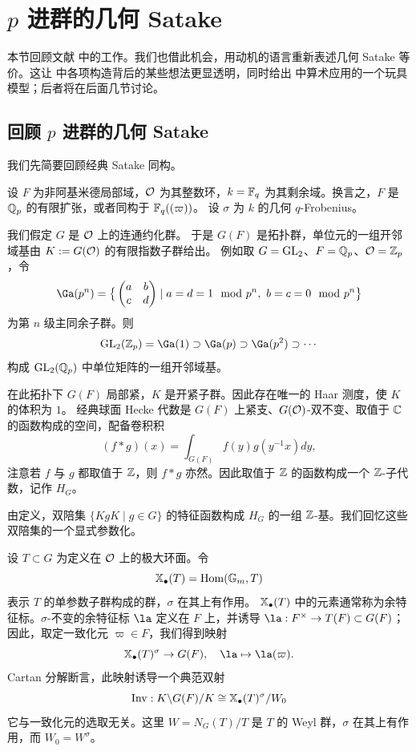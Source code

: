 \section{$p$ 进群的几何 Satake}
\label{S: GSat}

本节回顾文献 \cite{Zh1} 中的工作。我们也借此机会，用动机的语言重新表述几何 Satake 等价。这让 \cite{Zh1} 中各项构造背后的某些想法更显透明，同时给出 \cite{XZ} 中算术应用的一个玩具模型；后者将在后面几节讨论。

\subsection{回顾 $p$ 进群的几何 Satake}
\label{S: affGrass}

我们先简要回顾经典 Satake 同构。

设 $F$ 为非阿基米德局部域，${\mathcal O}$ 为其整数环，$k={\mathbb F}_q$ 为其剩余域。换言之，$F$ 是 ${\mathbb Q}_p$ 的有限扩张，或者同构于 ${\mathbb F}_q((\varpi))$。
设 $\sigma$ 为 $k$ 的几何 $q$-Frobenius。

我们假定 $G$ 是 ${\mathcal O}$ 上的连通约化群。
于是 $G(F)$ 是拓扑群，单位元的一组开邻域基由 $K:=G({\mathcal O})$ 的有限指数子群给出。
例如取 $G={\operatorname{GL}}_2$、$F={\mathbb Q}_p$、${\mathcal O}={\mathbb Z}_p$，令
$$\Ga(p^n)=\big\{\begin{pmatrix}a& b\\ c& d\end{pmatrix}\mid a=d=1 \mod p^n,\  b=c=0 \mod p^n\big\}$$
为第 $n$ 级主同余子群。则
$$\GL_2(\bZ_p)=\Ga(1)\supset\Ga(p)\supset\Ga(p^2)\supset\cdots$$ 构成 ${\operatorname{GL}}_2({\mathbb Q}_p)$ 中单位矩阵的一组开邻域基。

在此拓扑下 $G(F)$ 局部紧，$K$ 是开紧子群。因此存在唯一的 Haar 测度，使 $K$ 的体积为 $1$。
经典球面 Hecke 代数是 $G(F)$ 上紧支、$G({\mathcal O})$-双不变、取值于 ${\mathbb C}$ 的函数构成的空间，配备卷积积
\begin{equation}
\label{E:conv prod alge}
(f*g)(x)=\int_{G(F)}f(y)g(y^{-1}x)dy,
\end{equation}
注意若 $f$ 与 $g$ 都取值于 ${\mathbb Z}$，则 $f*g$ 亦然。因此取值于 ${\mathbb Z}$ 的函数构成一个 ${\mathbb Z}$-子代数，记作 $H_G$。

由定义，双陪集 $\{KgK\mid g\in G\}$ 的特征函数构成 $H_G$ 的一组 ${\mathbb Z}$-基。我们回忆这些双陪集的一个显式参数化。

设 $T\subset G$ 为定义在 ${\mathcal O}$ 上的极大环面。令
$$\mathbb{X}_\bullet(T)={\operatorname{Hom}}({\mathbb G}_m,T)$$ 表示 $T$ 的单参数子群构成的群，$\sigma$ 在其上有作用。
$\mathbb{X}_\bullet(T)$ 中的元素通常称为余特征标。$\sigma$-不变的余特征标 $\la$ 定义在 $F$ 上，并诱导 $\la: F^\times\to T(F)\subset G(F)$；因此，取定一致化元 $\varpi\in F$，我们得到映射
\begin{equation*}\label{cartan1}
\xcoch(T)^\sigma\to G(F), \quad \la\mapsto \la(\varpi).
\end{equation*}
Cartan 分解断言，此映射诱导一个典范双射
\begin{equation}\label{cartan2}
{\operatorname{Inv}}:  K\backslash G(F)/K\cong \mathbb{X}_\bullet(T)^{\sigma}/W_0 
\end{equation}
它与一致化元的选取无关。这里 $W=N_G(T)/T$ 是 $T$ 的 Weyl 群，$\sigma$ 在其上有作用，而 $W_0=W^{\sigma}$。

